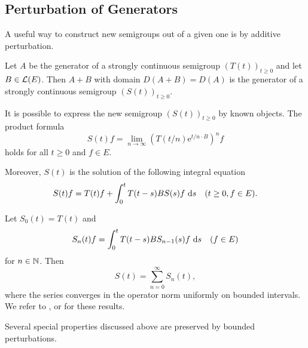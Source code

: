 \subsection{Perturbation of Generators} \label{subsec:a2-1.se8}
A useful way to construct new semigroups out of a given one is by additive perturbation.
\begin{theorem}\label{thm:a2-1.29}
Let $A$ be the generator of a strongly continuous semigroup $(T(t))_{t \geq 0}$ and let $B \in \mathcal{L}(E)$.
Then $A + B$ with domain $D(A+B) = D(A)$ is the generator of a strongly continuous semigroup $(S(t))_{t \geq 0}$.
\end{theorem}

It is possible to express the new semigroup $(S(t))_{t \geq 0}$ by known objects.
The product formula
\begin{equation}\label{eq:a2-1.8}
    S(t)f = \lim_{n \to \infty} (T(t/n)\mathrm{e}^{t/n \cdot B})^{n}f
\end{equation}
holds for all $t \geq 0$ and $f \in E$.

Moreover, $S(t)$ is the solution of the following integral equation
\begin{equation}\label{eq:a2-1.9}
    S(t)f = T(t)f + \int_{0}^{t} T(t-s)BS(s)f\, \mathop{}\!\mathrm{d}{s} \quad (t \geq 0, f \in E).
\end{equation}

Let $S_{0}(t) = T(t)$ and
\begin{equation}\label{eq:a2-1.10}
    S_{n}(t)f = \int_{0}^{t} T(t-s)BS_{n-1}(s)f\, \mathop{}\!\mathrm{d}{s} \quad (f \in E)
\end{equation}
for $n \in \mathbb{N}$. Then
\begin{equation}\label{eq:a2-1.11}
    S(t) = \sum_{n=0}^{\infty} S_{n}(t),
\end{equation}
where the series converges in the operator norm uniformly on bounded intervals.
We refer to \citet[III.1]{davies:1980}, \citet[I.6]{goldstein:1985a} or \citet[Chapter 3]{pazy:1983} for these results.

Several special properties discussed above are preserved by bounded perturbations.

